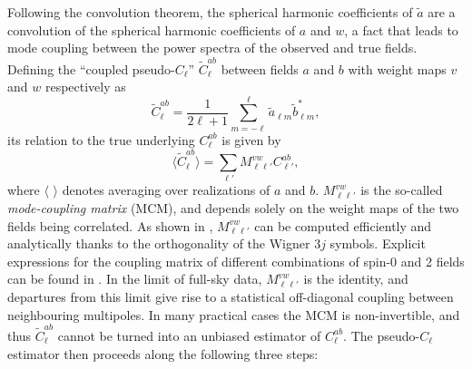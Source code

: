 \documentclass[a4paper,11pt]{article}
\begin{document}
     Following the convolution theorem, the spherical harmonic coefficients of $\tilde{a}$ are a convolution of the spherical harmonic coefficients of $a$ and $w$, a fact that leads to mode coupling between the power spectra of the observed and true fields. Defining the ``coupled pseudo-$C_\ell$'' $\tilde{C}^{ab}_\ell$ between fields $a$ and $b$ with weight maps $v$ and $w$ respectively as
      \begin{equation}
        \tilde{C}^{ab}_{\ell}=\frac{1}{2\ell+1}\sum_{m=-\ell}^\ell \tilde{a}_{\ell m}\tilde{b}^*_{\ell m},
      \end{equation}
      its relation to the true underlying $C^{ab}_\ell$ is given by
      \begin{equation}\label{eq:pcl_mcm}
        \langle\tilde{C}^{ab}_\ell\rangle=\sum_{\ell'}M^{vw}_{\ell\ell'}C^{ab}_{\ell'},
      \end{equation}
      where $\langle\,\,\rangle$ denotes averaging over realizations of $a$ and $b$. $M^{vw}_{\ell\ell'}$ is the so-called \emph{mode-coupling matrix} (MCM), and depends solely on the weight maps of the two fields being correlated. As shown in \cite{astro-ph/0105302}, $M^{vw}_{\ell\ell'}$ can be computed efficiently and analytically thanks to the orthogonality of the Wigner $3j$ symbols. Explicit expressions for the coupling matrix of different combinations of spin-0 and 2 fields can be found in \cite{1809.09603}. In the limit of full-sky data, $M^{vw}_{\ell\ell'}$ is the identity, and departures from this limit give rise to a statistical off-diagonal coupling between neighbouring multipoles. In many practical cases the MCM is non-invertible, and thus $\tilde{C}^{ab}_\ell$ cannot be turned into an unbiased estimator of $C_\ell^{ab}$. The pseudo-$C_\ell$ estimator then proceeds along the following three steps:
\end{document}
